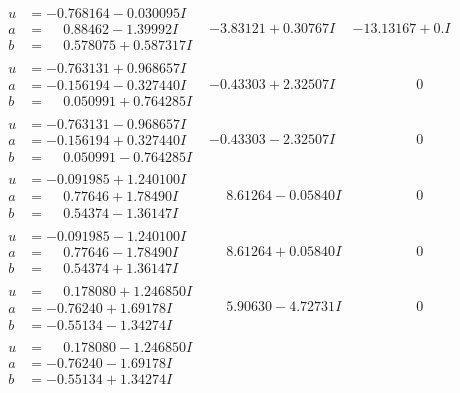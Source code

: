 \documentclass[1p]{elsarticle_modified}
\theoremstyle{definition}
\begin{document}
$$\begin{array}{c|c|c}
\begin{aligned}
u &= -0.768164 - 0.030095 I \\
a &= \phantom{-}0.88462 - 1.39992 I \\
b &= \phantom{-}0.578075 + 0.587317 I\end{aligned}
 & -3.83121 + 0.30767 I & -13.13167 + 0. I\phantom{ +0.000000I} \\ \hline\begin{aligned}
u &= -0.763131 + 0.968657 I \\
a &= -0.156194 - 0.327440 I \\
b &= \phantom{-}0.050991 + 0.764285 I\end{aligned}
 & -0.43303 + 2.32507 I & \phantom{-0.000000 } 0 \\ \hline\begin{aligned}
u &= -0.763131 - 0.968657 I \\
a &= -0.156194 + 0.327440 I \\
b &= \phantom{-}0.050991 - 0.764285 I\end{aligned}
 & -0.43303 - 2.32507 I & \phantom{-0.000000 } 0 \\ \hline\begin{aligned}
u &= -0.091985 + 1.240100 I \\
a &= \phantom{-}0.77646 + 1.78490 I \\
b &= \phantom{-}0.54374 - 1.36147 I\end{aligned}
 & \phantom{-}8.61264 - 0.05840 I & \phantom{-0.000000 } 0 \\ \hline\begin{aligned}
u &= -0.091985 - 1.240100 I \\
a &= \phantom{-}0.77646 - 1.78490 I \\
b &= \phantom{-}0.54374 + 1.36147 I\end{aligned}
 & \phantom{-}8.61264 + 0.05840 I & \phantom{-0.000000 } 0 \\ \hline\begin{aligned}
u &= \phantom{-}0.178080 + 1.246850 I \\
a &= -0.76240 + 1.69178 I \\
b &= -0.55134 - 1.34274 I\end{aligned}
 & \phantom{-}5.90630 - 4.72731 I & \phantom{-0.000000 } 0 \\ \hline\begin{aligned}
u &= \phantom{-}0.178080 - 1.246850 I \\
a &= -0.76240 - 1.69178 I \\
b &= -0.55134 + 1.34274 I\end{aligned}

\end{array}$$
\end{document}
